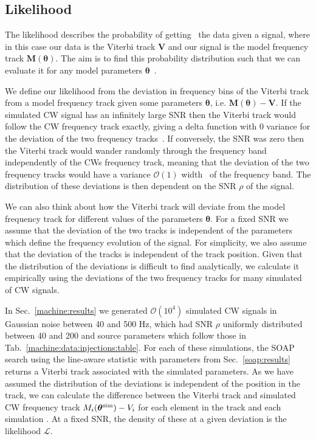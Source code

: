 %
%
\subsection{\label{par_est:bayes:likelihood}Likelihood}
%
%

The likelihood describes the probability of getting~ the data
given a signal, where in this case our data is the Viterbi track $\bm{V}$ and
our signal is the model frequency track $\bm{M}(\bm{\theta})$.  The aim is to
find this probability distribution such that we can evaluate it for any model
parameters $\bm{\theta}$~.

We define our likelihood from the deviation in frequency bins of the Viterbi
track from a model frequency track given some parameters $\bm{\theta}$, i.e.
$\bm{M}(\bm{\theta}) - \bm{V}$.  If the simulated \gls{CW} signal has an
infinitely large \gls{SNR} then the Viterbi track would follow the \gls{CW}
frequency track exactly, giving a delta function with 0 variance for the
deviation of the two frequency tracks~. If conversely, the \gls{SNR} was zero
then the Viterbi track would wander randomly through the frequency band
independently of the \glspl{CW} frequency track, meaning that the deviation of
the two frequency tracks would have a variance $\mathcal{O}(1)$
width~ of the
frequency band.  The distribution of these deviations is then dependent on the
\gls{SNR} $\rho$ of the signal.  

We can also think about how the Viterbi track will deviate from the model frequency track for different values of the parameters $\bm{\theta}$.
For a fixed \gls{SNR} we assume that the deviation of the two tracks is independent of the parameters which define the frequency evolution of the signal. 
For simplicity, we also assume that the deviation of the tracks is independent of the track position.
Given that the distribution of the deviations is difficult to find analytically, we calculate it empirically using the deviations of the two frequency tracks for many simulated of \gls{CW} signals. 

In Sec.~\ref{machine:results} we generated $\mathcal{O}(10^{4})$ simulated
\gls{CW} signals in Gaussian noise between 40 and 500 Hz, which had \gls{SNR}
$\rho$ uniformly distributed between 40 and 200 and
source parameters which follow those in
Tab.~\ref{machine:data:injections:table}. For each of these simulations, the
SOAP search using the line-aware statistic with parameters from
Sec.~\ref{soap:results} returns a Viterbi track associated with the simulated
parameters.  As we have assumed the distribution of the deviations is independent of the position in the track, we can calculate the difference between the Viterbi track and simulated \gls{CW} frequency track $M_i(\bm{\theta}^{\rm{sim}}) - V_i$ for each
element in the track and each simulation .
At a fixed \gls{SNR}, the density of these at a given deviation is the likelihood $\mathcal{L}$. 


